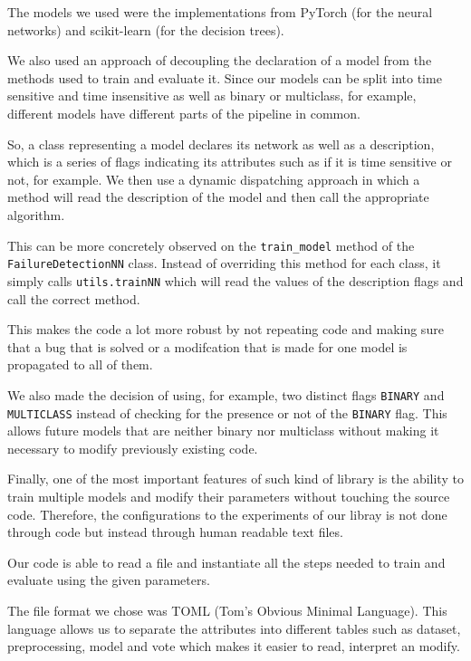 The models we used were the implementations from PyTorch (for the neural networks) and scikit-learn (for the decision trees).

We also used an approach of decoupling the declaration of a model from the methods used to train and evaluate it.
Since our models can be split into time sensitive and time insensitive as well as binary or multiclass, for example, different models have different parts of the pipeline in common.

So, a class representing a model declares its network as well as a description, which is a series of flags indicating its attributes such as if it is time sensitive or not, for example.
We then use a dynamic dispatching approach in which a method will read the description of the model and then call the appropriate algorithm.

This can be more concretely observed on the \verb|train_model| method of the \\ \verb|FailureDetectionNN| class.
Instead of overriding this method for each class, it simply calls \verb|utils.trainNN| which will read the values of the description flags and call the correct method.

This makes the code a lot more robust by not repeating code and making sure that a bug that is solved or a modifcation that is made for one model is propagated to all of them.

We also made the decision of using, for example, two distinct flags \verb|BINARY| and \\ \verb|MULTICLASS| instead of checking for the presence or not of the \verb|BINARY| flag.
This allows future models that are neither binary nor multiclass without making it necessary to modify previously existing code.

Finally, one of the most important features of such kind of library is the ability to train multiple models and modify their parameters without touching the source code.
Therefore, the configurations to the experiments of our libray is not done through code but instead through human readable text files.

Our code is able to read a file and instantiate all the steps needed to train and evaluate using the given parameters.

The file format we chose was TOML (Tom's Obvious Minimal Language).
This language allows us to separate the attributes into different tables such as dataset, preprocessing, model and vote which makes it easier to read, interpret an modify.

